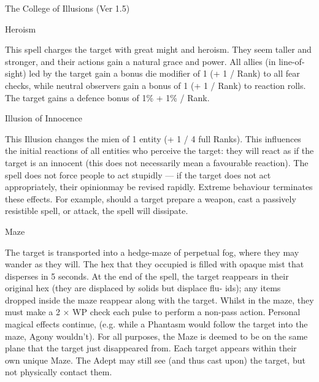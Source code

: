 \begin{Chapter}{The College of Illusions (Ver 1.5)}
\begin{spell}[S-8]{Heroism}

\begin{effects}
This spell charges the target with great might and heroism. They seem
taller and stronger, and their actions gain a natural grace and power.
All allies (in line-of-sight) led by the target gain a bonus die
modifier of 1 (+ 1 / Rank) to all fear checks, while neutral observers
gain a bonus of 1 (+ 1 / Rank) to reaction rolls.  The target gains a
defence bonus of 1\% + 1\% / Rank.
\end{effects}
\end{spell}

\begin{spell}[S-9]{Illusion of Innocence}

\begin{effects}
This Illusion changes the mien of 1 entity (+ 1 / 4 full Ranks).  This
influences the initial reactions of all entities who perceive the
target: they will react as if the target is an innocent (this does not
necessarily mean a favourable reaction).  The spell does not force
people to act stupidly — if the target does not act appropriately,
their opinionmay be revised rapidly.  Extreme behaviour terminates
these effects.  For example, should a target prepare a weapon, cast a
passively resistible spell, or attack, the spell will dissipate.
\end{effects}
\end{spell}

\begin{spell}[S-10]{Maze}

\begin{effects}
The target is transported into a hedge-maze of perpetual fog, where
they may wander as they will.  The hex that they occupied is filled
with opaque mist that disperses in 5 seconds. At the end of the spell,
the target reappears in their original hex (they are displaced by
solids but displace flu- ids); any items dropped inside the maze
reappear along with the target.  Whilst in the maze, they must make a
2 × WP check each pulse to perform a non-pass action. Personal magical
effects continue, (e.g. while a Phantasm would follow the target into
the maze, Agony wouldn’t).  For all purposes, the Maze is deemed to be
on the same plane that the target just disappeared from.  Each target
appears within their own unique Maze. The Adept may still see (and
thus cast upon) the target, but not physically contact them.
\end{effects}
\end{spell}


\end{Chapter}
